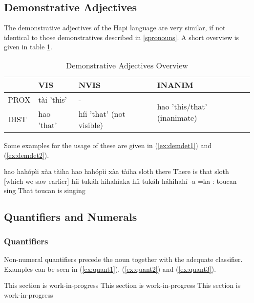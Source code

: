 \documentclass[a4paper, 12pt, oneside]{memoir}
\begin{document}
\subsection{Demonstrative Adjectives}\label{sdemonstrative}
The demonstrative adjectives of the Hapi language are very similar, if not identical to those demonstratives described in \ref{spronouns}. A short overview is given in table \ref{t:demdet}.
\begin{table}[H]
\begin{tabular}{@{}llll@{}}
\toprule
     & VIS        & NVIS                     & INANIM                                       \\ \midrule
PROX & tài 'this' & -                        & \multirow{2}{*}{hao 'this/that' (inanimate)} \\
DIST & hao 'that' & híi 'that' (not visible) &                                              \\ \bottomrule
\end{tabular}
\caption{Demonstrative Adjectives Overview}
\label{t:demdet}
\end{table}
Some examples for the usage of these are given in (\ref{ex:demdet1}) and (\ref{ex:demdet2}).
\begin{examples}
\ex \label{ex:demdet1}
\words hao hahópìi xàa tàiha
\bits hao hahópìi xàa tàiha
\gloss {\Demdist} sloth {\Cop} there
\tr There is that sloth [which we saw earlier]
\ex \label{ex:demdet2}
\words híi tukáh hihahíaka
\bits híi tukáh háhihahí -a =ka 
\gloss {\Det}:{\Nvis} toucan sing {\St} {\Decl}
\tr That toucan is singing
\end{examples}
\subsection{Quantifiers and Numerals}\label{squantifier}
\subsubsection{Quantifiers}
Non-numeral quantifiers precede the noun together with the adequate classifier. Examples can be seen in (\ref{ex:quant1}), (\ref{ex:quant2}) and (\ref{ex:quant3}).
\begin{examples}
\ex \label{ex:quant1}
This section is work-in-progress
\ex \label{ex:quant2}
This section is work-in-progress
\ex \label{ex:quant3}
This section is work-in-progress
\end{examples}
\end{document}

